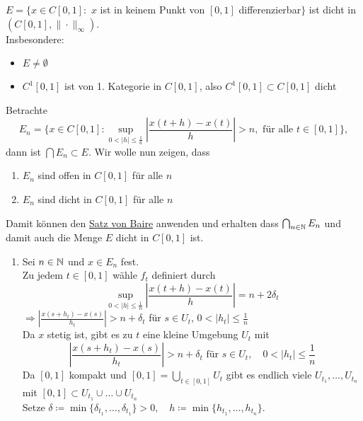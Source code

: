 \begin{satz}
	$E = \{ x \in C[0, 1]:$ $x$ ist in keinem Punkt von $[0, 1]$ differenzierbar$\}$ ist dicht in $(C[0, 1], \|\cdot\|_{\infty})$. \\
	Insbesondere:
 		\begin{itemize}
			\item $E \neq \emptyset$
			\item $C^{1}[0, 1]$ ist von 1. Kategorie in $C[0, 1]$, also $C^{1}[0, 1] \subset C[0, 1]$ dicht
		\end{itemize}
\end{satz}

\begin{beweis}
	Betrachte 
	\[ E_{n} = \{ x \in C[0, 1]: \sup_{0 < |h| \leq \frac{1}{n}} \left| \frac{x(t + h) - x(t)}{h} \right| > n, \text{ für alle } t \in [0, 1] \}, \]
	dann ist $\bigcap E_{n} \subset E$. Wir wolle nun zeigen, dass 
	\begin{enumerate}[label=\roman*\upshape)]
		\item $E_{n}$ sind offen in $C[0, 1]$ für alle $n$
		\item $E_{n}$ sind dicht in $C[0, 1]$ für alle $n$
	\end{enumerate}
	Damit können den \hyperref[satz:9.1-baire]{Satz von Baire} anwenden und erhalten dass $\bigcap_{n \in \mathbb{N}} E_{n}$ und damit auch die Menge $E$ dicht in $C[0, 1]$ ist. \\
	\begin{enumerate}[label=\roman*\upshape)]
		\item Sei $n \in \mathbb{N}$ und $x \in E_{n}$ fest. \\
			Zu jedem $t \in [0, 1]$ wähle $f_{t}$ definiert durch
			\[ \sup_{0 < |h| \leq \frac{1}{n}} \left| \frac{x(t + h) - x(t)}{h} \right| = n + 2 \delta_{t} \]
			$\Rightarrow \left| \frac{x(s + h_{t}) - x(s)}{h_{t}} \right| > n + \delta_{t}$ für $s \in U_{t}$, $0 < |h_{t}| \leq \frac{1}{n} $ \\
			Da $x$ stetig ist, gibt es zu $t$ eine kleine Umgebung $U_{t}$ mit
			\[ \left| \frac{x(s + h_{t}) - x(s)}{h_{t}} \right| > n + \delta_{t} \text{ für } s \in U_{t}, \quad 0 < |h_{t}| \leq \frac{1}{n} \]
			Da $[0, 1]$ kompakt und $[0, 1] = \bigcup_{t \in [0, 1]} U_{t}$ gibt es endlich viele $U_{t_{1}}, \dotsc, U_{t_{n}}$ mit $[0, 1] \subset U_{t_{1}} \cup \dotsc \cup U_{t_{n}}$ \\
			Setze $\delta \coloneqq \min \{ \delta_{t_{1}}, \dotsc, \delta_{t_{1}} \} > 0, \quad h \coloneqq \min \{ h_{t_{1}}, \dotsc, h_{t_{n}} \}$. \\

\end{enumerate}
\end{beweis}

